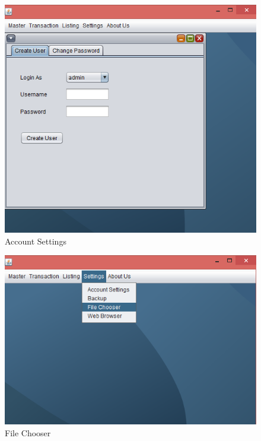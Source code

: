 \begin{figure}[ht]
\begin{center}
\includegraphics[scale=0.5]{images/image48.png}
\end{center}
\caption{Account Settings}
\label{Account Settings}
\end{figure}


\begin{figure}[ht]
\begin{center}
\includegraphics[scale=0.5]{images/image51.png}
\end{center}
\caption{File Chooser}
\label{File Chooser}
\end{figure}


